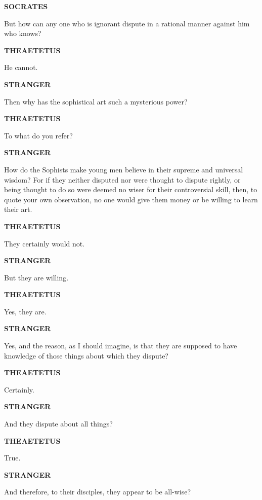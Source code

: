 \documentclass[11pt,letter]{article}
\begin{document}
\par \textbf{SOCRATES}
\par   But how can any one who is ignorant dispute in a rational manner against him who knows?

\par \textbf{THEAETETUS}
\par   He cannot.

\par \textbf{STRANGER}
\par   Then why has the sophistical art such a mysterious power?

\par \textbf{THEAETETUS}
\par   To what do you refer?

\par \textbf{STRANGER}
\par   How do the Sophists make young men believe in their supreme and universal wisdom? For if they neither disputed nor were thought to dispute rightly, or being thought to do so were deemed no wiser for their controversial skill, then, to quote your own observation, no one would give them money or be willing to learn their art.

\par \textbf{THEAETETUS}
\par   They certainly would not.

\par \textbf{STRANGER}
\par   But they are willing.

\par \textbf{THEAETETUS}
\par   Yes, they are.

\par \textbf{STRANGER}
\par   Yes, and the reason, as I should imagine, is that they are supposed to have knowledge of those things about which they dispute?

\par \textbf{THEAETETUS}
\par   Certainly.

\par \textbf{STRANGER}
\par   And they dispute about all things?

\par \textbf{THEAETETUS}
\par   True.

\par \textbf{STRANGER}
\par   And therefore, to their disciples, they appear to be all-wise?
\end{document}
